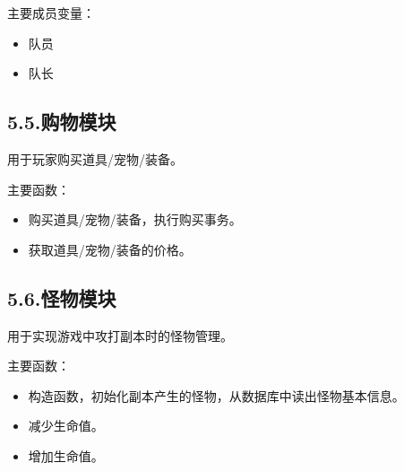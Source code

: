 \documentclass{article}
\begin{document}
\noindent{}主要成员变量：%

\begin{itemize}[noitemsep,topsep=\mdcompacttopsep]%

\item{}队员%

\item{}队长%
\end{itemize}%

\subsection{5.5.\hspace*{0.5em}购物模块}\label{55}%

\noindent{}用于玩家购买道具/宠物/装备。%

主要函数：%

\begin{itemize}[noitemsep,topsep=\mdcompacttopsep]%

\item{}购买道具/宠物/装备，执行购买事务。%

\item{}获取道具/宠物/装备的价格。%
\end{itemize}%

\subsection{5.6.\hspace*{0.5em}怪物模块}\label{55.5}%

\noindent{}用于实现游戏中攻打副本时的怪物管理。%

主要函数：%

\begin{itemize}[noitemsep,topsep=\mdcompacttopsep]%

\item{}构造函数，初始化副本产生的怪物，从数据库中读出怪物基本信息。%

\item{}减少生命值。%

\item{}增加生命值。%
\end{itemize}%
\end{document}
